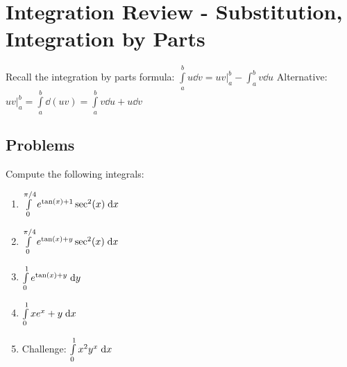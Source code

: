 \documentclass[letterpaper,11pt]{article}
\begin{document}
\section*{Integration Review - Substitution, Integration by Parts}
  Recall the integration by parts formula:
  $\int \limits_{a}^{b} u \dd{v} = u v \big \rvert_{a}^{b} - \int_{a}^{b} v \dd{u}$
  Alternative: $u v \big \rvert_{a}^{b} = \int \limits_{a}^{b} \dd{(u v)} = \int \limits_{a}^{b} v \dd{u} + u \dd{v}$
  \subsection*{Problems}
  Compute the following integrals:
  \begin{enumerate}
    \item $\int \limits_{0}^{\pi / 4} e^{\tan(x) + 1} \sec^2(x) \;\mathrm{d}x$\\
      \newline
      \newline
      \newline
      \newline

    \item $\int \limits_{0}^{\pi / 4} e^{\tan(x) + y} \sec^2(x) \;\mathrm{d}x$\\
      \newline
      \newline
      \newline
      \newline

    \item $\int \limits_{0}^{1} e^{\tan(x) + y} \;\mathrm{d}y$\\
      \newline
      \newline
      \newline
      \newline

    \item $\int \limits_{0}^{1} x e^{x} + y \;\mathrm{d}x$\\
      \newline
      \newline
      \newline
      \newline

    \item Challenge: $\int \limits_{0}^{1} x^2 y^{x} \;\mathrm{d}x$\\
      \newline
      \newline
      \newline
      \newline
  \end{enumerate}
\end{document}
